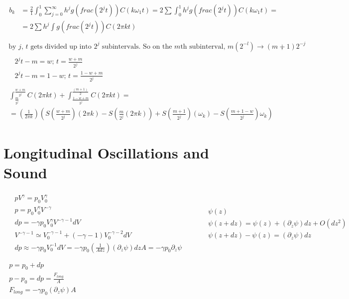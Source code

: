 \documentclass[twoside,10pt]{amsart}
\newcommand{\problemhead}[1]
  {\smallskip
   \noindent{\large\bf Problem #1.}
   \smallskip}
\begin{document}
\[
\begin{gathered}
  \begin{aligned}
  b_k & = \frac{2}{1} \int_0^1 \sum_{j=0}^{\infty} h^j g(frac(2^j t)) C(k \omega_1 t) = 2 \sum \int_0^1 h^j g(frac(2^j t)) C(k \omega_1 t) = \\
& =   2 \sum h^j \int g (frac(2^j t)) C(2\pi k t) \\
  \end{aligned} \\
  \text{ by $j$, $t$ gets divided up into $2^j$ subintervals.  So on the $m$th subinterval, $m(2^{-l}) \to (m+1) 2^{-j}$ }, \\ 
  \begin{aligned}
    & 2^j t - m = w ; \, t = \frac{ w+m }{ 2^j } \\
    & 2^j t - m = 1 - w; \, t = \frac{ 1 - w + m }{ 2^j }
  \end{aligned} \\
\begin{gathered}
\int_{\frac{m}{2^j}}^{ \frac{ w+m}{2^j } } C(2\pi k t) + \int_{ \frac{ 1 - w + m }{ 2^j }}^{ \frac{ (m+1)}{2} } C(2\pi k t) = \\
= \left( \frac{1}{ 2 \pi k } \right) \left( S\left( \frac{ w + m }{2^j} \right)(2\pi k) - S\left( \frac{ m }{2^j }(2\pi k ) \right) + S\left( \frac{ m+1}{2^j } \right)(\omega_k) - S\left( \frac{ m+1 - w }{2^j } \right) \omega_k \right)
\end{gathered}
\end{gathered}
\]

\section{  Longitudinal Oscillations and Sound }

\problemhead{7.1} 
\[
\begin{gathered}
  \begin{aligned}
    & pV^{\gamma} = p_0 V_0^{\gamma} \\
    & p = p_0 V_0^{\gamma}V^{-\gamma} \\
    & dp = -\gamma p_0 V_0^{\gamma}V^{-\gamma -1}dV \\
    & V^{-\gamma -1} \simeq V_0^{-\gamma-1} +(-\gamma -1)V_0^{-\gamma-2}dV \\
    & dp \approx -\gamma p_0 V_0^{-1}dV = -\gamma p_0 \left( \frac{1}{A dz} \right)(\partial_z \psi )dz A = -\gamma p_0 \partial_z \psi 
  \end{aligned} \quad \quad \, 
\begin{aligned}
  & \psi(z) \\
  & \psi(z+dz) = \psi(z) + (\partial_z \psi)dz + O(dz^2) \\
  & \psi(z+dz) - \psi(z) = (\partial_z \psi)dz 
\end{aligned} \\
\quad \\
\begin{gathered}
  p = p_0 + dp \\
  p-p_0  = dp = \frac{F_{long}}{A } \\
  F_{long} = -\gamma p_0 (\partial_z \psi) A
\end{gathered}
\end{gathered}
\]
\end{document}
